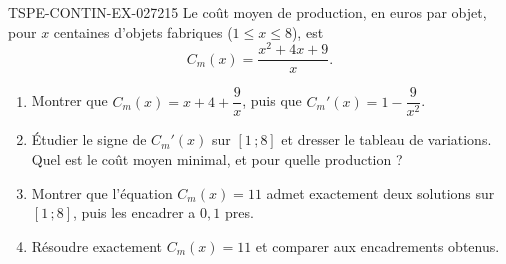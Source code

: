 \begin{exercice}{TSPE-CONTIN-EX-027}{2}{15}
Le coût moyen de production, en euros par objet, pour $x$ centaines d'objets fabriques ($1 \leq x \leq 8$), est
\[ C_m(x) = \frac{x^2 + 4x + 9}{x}. \]
\begin{enumerate}
  \item Montrer que $C_m(x) = x + 4 + \dfrac{9}{x}$, puis que $C_m'(x) = 1 - \dfrac{9}{x^2}$.
  \item Étudier le signe de $C_m'(x)$ sur $[1\,;8]$ et dresser le tableau de variations. Quel est le coût moyen minimal, et pour quelle production ?
  \item Montrer que l'équation $C_m(x) = 11$ admet exactement deux solutions sur $[1\,;8]$, puis les encadrer a $0{,}1$ pres.
  \item Résoudre exactement $C_m(x) = 11$ et comparer aux encadrements obtenus.
\end{enumerate}
\end{exercice}

